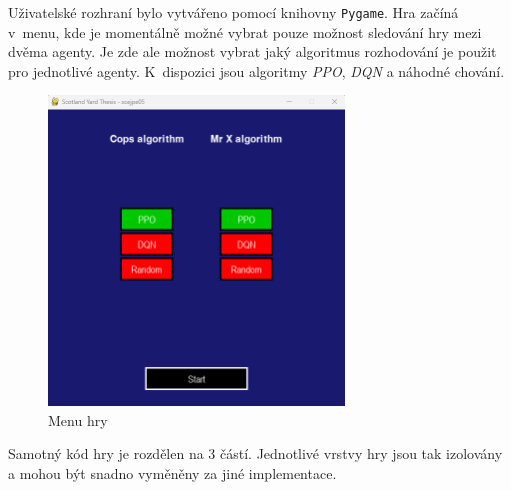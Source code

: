 Uživatelské rozhraní bylo vytvářeno pomocí knihovny \texttt{Pygame}.
Hra začíná v~menu, kde je momentálně možné vybrat pouze možnost sledování hry mezi dvěma agenty.
Je zde ale možnost vybrat jaký algoritmus rozhodování je použit pro jednotlivé agenty.
K~dispozici jsou algoritmy \emph{PPO}, \emph{DQN} a náhodné chování.

\begin{figure}[H]
	\centering
	\includegraphics[width=0.7\textwidth]{obrazky-figures/game_title}
	\caption{Menu hry}\label{fig:game_title}
\end{figure}

Samotný kód hry je rozdělen na 3 částí.
Jednotlivé vrstvy hry jsou tak izolovány a mohou být snadno vyměněny za jiné implementace.

